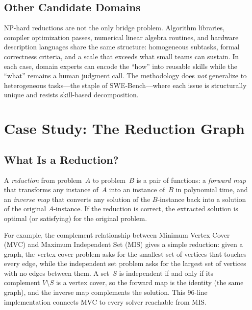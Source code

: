 \documentclass[conference]{IEEEtran}
\begin{document}
\subsection{Other Candidate Domains}

NP-hard reductions are not the only bridge problem.
Algorithm libraries, compiler optimization passes, numerical linear algebra routines, and hardware description languages share the same structure: homogeneous subtasks, formal correctness criteria, and a scale that exceeds what small teams can sustain.
In each case, domain experts can encode the ``how'' into reusable skills while the ``what'' remains a human judgment call.
The methodology does \emph{not} generalize to heterogeneous tasks---the staple of SWE-Bench---where each issue is structurally unique and resists skill-based decomposition.

\section{Case Study: The Reduction Graph}\label{sec:graph}

\subsection{What Is a Reduction?}

A \emph{reduction} from problem~$A$ to problem~$B$ is a pair of functions: a \emph{forward map} that transforms any instance of~$A$ into an instance of~$B$ in polynomial time, and an \emph{inverse map} that converts any solution of the $B$-instance back into a solution of the original $A$-instance.
If the reduction is correct, the extracted solution is optimal (or satisfying) for the original problem.

For example, the complement relationship between Minimum Vertex Cover (MVC) and Maximum Independent Set (MIS) gives a simple reduction: given a graph, the vertex cover problem asks for the smallest set of vertices that touches every edge, while the independent set problem asks for the largest set of vertices with no edges between them.
A set~$S$ is independent if and only if its complement $V \setminus S$ is a vertex cover, so the forward map is the identity (the same graph), and the inverse map complements the solution.
This 96-line implementation connects MVC to every solver reachable from MIS.
\end{document}
